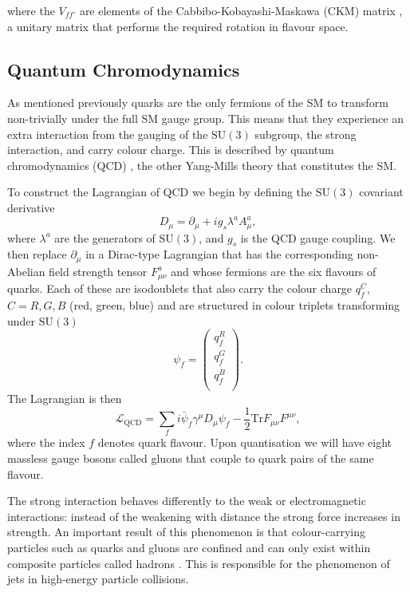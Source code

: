 where the $V_{ff'}$ are elements of the Cabbibo-Kobayashi-Maskawa (CKM) matrix \cite{Cabibbo,KobayashiMaskawa}, a unitary matrix that performs the required rotation in flavour space.

\subsection{Quantum Chromodynamics}
As mentioned previously quarks are the only fermions of the SM to transform non-trivially under the full SM gauge group. This means that they experience an extra interaction from the gauging of the $\mathrm{SU}(3)$ subgroup, the strong interaction, and carry colour charge. This is described by quantum chromodynamics (QCD) \cite{PDG}, the other Yang-Mills theory that constitutes the SM. 

To construct the Lagrangian of QCD we begin by defining the $\mathrm{SU}(3)$ covariant derivative
\begin{equation}
    D_{\mu} = \partial_{\mu} + ig_{s}\lambda^{a}A^{a}_{\mu},
\end{equation}
where $\lambda^{a}$ are the generators of $\mathrm{SU}(3)$, and $g_{s}$ is the QCD gauge coupling. We then replace $\partial_{\mu}$ in a Dirac-type Lagrangian that has the corresponding non-Abelian field strength tensor $F^{a}_{\mu\nu}$ and whose fermions are the six flavours of quarks. 
Each of these are isodoublets that also carry the colour charge $q^{C}_{f}$, $C=R,G,B$ (red, green, blue) and are structured in colour triplets transforming under $\mathrm{SU}(3)$
\begin{equation}
    \psi_{f} = \begin{pmatrix}
        q_{f}^{R} \\
        q_{f}^{G} \\
        q_{f}^{B} \\
    \end{pmatrix}.
\end{equation}
The Lagrangian is then
\begin{equation}
    \mathcal{L}_{\mathrm{QCD}} = \sum_{f}i\bar{\psi}_{f}\gamma^{\mu}D_{\mu}\psi_{f} - \frac{1}{2}\mathrm{Tr}F_{\mu\nu}F^{\mu\nu},
\end{equation}
where the index $f$ denotes quark flavour. Upon quantisation we will have eight massless gauge bosons called gluons that couple to quark pairs of the same flavour. 

The strong interaction behaves differently to the weak or electromagnetic interactions: instead of the weakening with distance the strong force increases in strength. An important result of this phenomenon is that colour-carrying particles such as quarks and gluons are confined and can only exist within composite particles called hadrons \cite{PDG}. This is responsible for the phenomenon of jets in high-energy particle collisions. 

